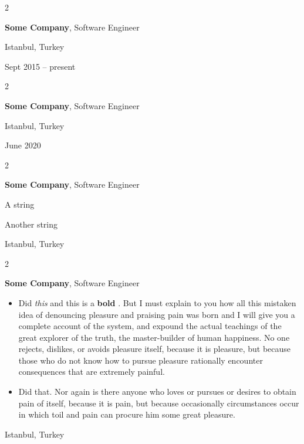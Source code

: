 \documentclass[10pt, letterpaper]{article}
\newenvironment{summary}{
    \begin{description}[
        topsep=0.10 cm,
        parsep=0.10 cm,
        partopsep=0pt,
        itemsep=0pt,
        leftmargin=0.4 cm + 10pt
    ]
}{
    \end{description}
} %
\newenvironment{highlights}{
    \begin{itemize}[
        topsep=0.10 cm,
        parsep=0.10 cm,
        partopsep=0pt,
        itemsep=0pt,
        leftmargin=0.4 cm + 10pt
    ]
}{
    \end{itemize}
} %
\newenvironment{twocolentry}[2][]{
    \onecolentry
    \def\secondColumn{#2}
    \setcolumnwidth{\fill, 4.5 cm}
    \begin{paracol}{2}
}{
    \switchcolumn \raggedleft \secondColumn
    \end{paracol}
    \endonecolentry
} %
\let\hrefWithoutArrow\href
\renewcommand{\href}[2]{\hrefWithoutArrow{#1}{\ifthenelse{\equal{#2}{}}{ }{#2 }\raisebox{.15ex}{\footnotesize \faExternalLink*}}}
\begin{document}
        \vspace{0.2 cm}

        \begin{twocolentry}{
            Istanbul, Turkey

        Sept 2015 – present
        }
            \textbf{Some \textnormal{Company}}, Software Engineer
        \end{twocolentry}


        \vspace{0.2 cm}

        \begin{twocolentry}{
            Istanbul, Turkey

        June 2020
        }
            \textbf{Some \textnormal{Company}}, Software Engineer
        \end{twocolentry}


        \vspace{0.2 cm}

        \begin{twocolentry}{
            Istanbul, Turkey
        }
            \textbf{Some \textnormal{Company}}, Software Engineer
            \begin{summary}
                \item A string
                \item Another string
            \end{summary}
        \end{twocolentry}


        \vspace{0.2 cm}

        \begin{twocolentry}{
            Istanbul, Turkey
        }
            \textbf{Some \textnormal{Company}}, Software Engineer
            \begin{highlights}
                \item Did \textit{this} and this is a \textbf{bold} \href{https://example.com}{link}. But I must explain to you how all this mistaken idea of denouncing pleasure and praising pain was born and I will give you a complete account of the system, and expound the actual teachings of the great explorer of the truth, the master-builder of human happiness. No one rejects, dislikes, or avoids pleasure itself, because it is pleasure, but because those who do not know how to pursue pleasure rationally encounter consequences that are extremely painful.
                \item Did that. Nor again is there anyone who loves or pursues or desires to obtain pain of itself, because it is pain, but because occasionally circumstances occur in which toil and pain can procure him some great pleasure.
            \end{highlights}
        \end{twocolentry}
\end{document}
